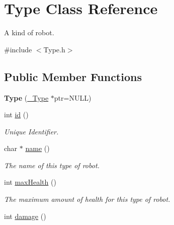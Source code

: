 \hypertarget{classType}{
\section{Type Class Reference}
\label{classType}
}


A kind of robot.  




{\ttfamily \#include $<$Type.h$>$}

\subsection*{Public Member Functions}
\begin{DoxyCompactItemize}
\item 
\hypertarget{classType_a1ddf222b4ca068faa8a5dd5b0a75188a}{
{\bfseries Type} (\hyperlink{struct__Type}{\_\-Type} $\ast$ptr=NULL)}
\label{classType_a1ddf222b4ca068faa8a5dd5b0a75188a}

\item 
\hypertarget{classType_acc34ac87daf59227b559d4bd7e1ecaad}{
int \hyperlink{classType_acc34ac87daf59227b559d4bd7e1ecaad}{id} ()}
\label{classType_acc34ac87daf59227b559d4bd7e1ecaad}

\begin{DoxyCompactList}\small\item\em Unique Identifier. \item\end{DoxyCompactList}\item 
\hypertarget{classType_ab64497d7b4de508bb85dd700599cbfb4}{
char $\ast$ \hyperlink{classType_ab64497d7b4de508bb85dd700599cbfb4}{name} ()}
\label{classType_ab64497d7b4de508bb85dd700599cbfb4}

\begin{DoxyCompactList}\small\item\em The name of this type of robot. \item\end{DoxyCompactList}\item 
\hypertarget{classType_aa7209c78027bb4ba66a58c78464a4e89}{
int \hyperlink{classType_aa7209c78027bb4ba66a58c78464a4e89}{maxHealth} ()}
\label{classType_aa7209c78027bb4ba66a58c78464a4e89}

\begin{DoxyCompactList}\small\item\em The maximum amount of health for this type of robot. \item\end{DoxyCompactList}\item 
\hypertarget{classType_ac0b7566ef22734df58ef6d7ebbf4b044}{
int \hyperlink{classType_ac0b7566ef22734df58ef6d7ebbf4b044}{damage} ()}
\label{classType_ac0b7566ef22734df58ef6d7ebbf4b044}


\end{DoxyCompactItemize}
